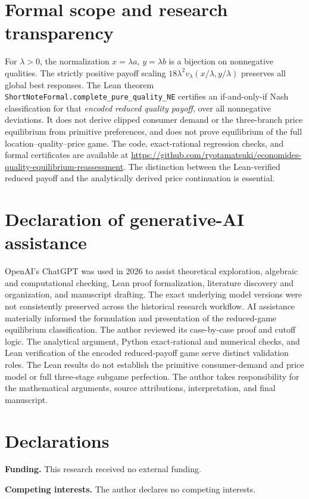 \documentclass[11pt]{article}
\begin{document}
\section{Formal scope and research transparency}
\label{app:transparency}
For $\lambda>0$, the normalization
$x=\lambda a$, $y=\lambda b$ is
a bijection on nonnegative qualities.
The strictly positive payoff scaling
$18\lambda^2v_\lambda(x/\lambda,y/\lambda)$
preserves all global best responses.
The Lean theorem
\texttt{ShortNoteFormal.complete\_pure\_quality\_NE}
certifies an if-and-only-if Nash
classification for that \emph{encoded
reduced quality payoff}, over all
nonnegative deviations. It does not
derive clipped consumer demand or
the three-branch price equilibrium from
primitive preferences, and does not
prove equilibrium of the full
location--quality--price game.
The code, exact-rational regression checks,
and formal certificates are available at
\url{https://github.com/ryotamatsuki/economides-quality-equilibrium-reassessment}.
The distinction between the Lean-verified
reduced payoff and the analytically
derived price continuation is essential.

\section*{Declaration of generative-AI assistance}
OpenAI's ChatGPT was used in 2026 to assist
theoretical exploration, algebraic and
computational checking, Lean proof
formalization, literature discovery and
organization, and manuscript drafting.
The exact underlying model versions were not
consistently preserved across the historical
research workflow. AI assistance materially
informed the formulation and presentation of
the reduced-game equilibrium classification.
The author reviewed its case-by-case proof and
cutoff logic. The analytical argument, Python
exact-rational and numerical checks, and Lean
verification of the encoded reduced-payoff
game serve distinct validation roles.
The Lean results do not establish the primitive
consumer-demand and price model or
full three-stage subgame perfection.
The author takes responsibility for the
mathematical arguments, source attributions,
interpretation, and final manuscript.

\section*{Declarations}
\noindent\textbf{Funding.} This research received no external funding.

\noindent\textbf{Competing interests.} The author declares no competing interests.
\end{document}
